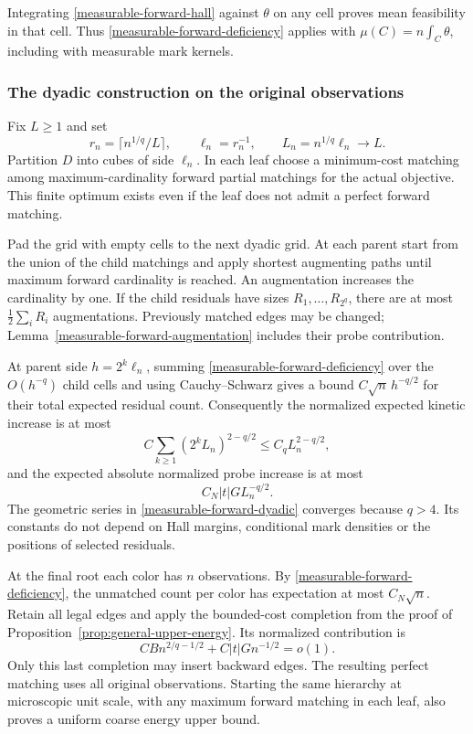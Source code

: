 \documentclass[11pt,reqno]{amsart}
\theoremstyle{definition}
\theoremstyle{remark}
\numberwithin{equation}{section}
\begin{document}
Integrating \eqref{measurable-forward-hall} against \(\theta\) on
any cell proves mean feasibility in that cell. Thus
\eqref{measurable-forward-deficiency} applies with
\(\mu(C)=n\int_C\theta\), including with measurable mark kernels.

\subsubsection{The dyadic construction on the original observations}

Fix \(L\ge1\) and set
\[
 r_n=\lceil n^{1/q}/L\rceil,\qquad
 \ell_n=r_n^{-1},\qquad L_n=n^{1/q}\ell_n\longrightarrow L.
\]
Partition \(D\) into cubes of side \(\ell_n\). In each leaf choose
a minimum-cost matching among maximum-cardinality forward partial
matchings for the actual objective. This finite optimum exists even
if the leaf does not admit a perfect forward matching.

Pad the grid with empty cells to the next dyadic grid. At each parent
start from the union of the child matchings and apply shortest
augmenting paths until maximum forward cardinality is reached.
An augmentation increases the cardinality by one. If the child
residuals have sizes \(R_1,\ldots,R_{2^q}\), there are at most
\(\frac12\sum_iR_i\) augmentations. Previously matched edges may be
changed; Lemma~\ref{measurable-forward-augmentation} includes their
probe contribution.

At parent side \(h=2^k\ell_n\), summing
\eqref{measurable-forward-deficiency} over the \(O(h^{-q})\)
child cells and using Cauchy--Schwarz gives a bound
\(C\sqrt n\,h^{-q/2}\) for their total expected residual count.
Consequently the normalized expected kinetic increase is at most
\begin{equation}
\label{measurable-forward-dyadic}
 C\sum_{k\ge1}(2^kL_n)^{2-q/2}
                  \le C_qL_n^{2-q/2},
\end{equation}
and the expected absolute normalized probe increase is at most
\begin{equation}
\label{measurable-forward-probe-repair}
                    C_N|t|G L_n^{-q/2}.
\end{equation}
The geometric series in \eqref{measurable-forward-dyadic} converges
because \(q>4\). Its constants do not depend on Hall margins,
conditional mark densities or the positions of selected residuals.

At the final root each color has \(n\) observations. By
\eqref{measurable-forward-deficiency}, the unmatched count per color
has expectation at most \(C_N\sqrt n\). Retain all legal edges and
apply the bounded-cost completion from the proof of
Proposition~\ref{prop:general-upper-energy}. Its normalized contribution is
\begin{equation}
\label{measurable-forward-root}
       CB n^{2/q-1/2}+C|t|G n^{-1/2}=o(1).
\end{equation}
Only this last completion may insert backward edges. The resulting
perfect matching uses all original observations. Starting the same
hierarchy at microscopic unit scale, with any maximum forward matching
in each leaf, also proves a uniform coarse energy upper bound.
\end{document}
